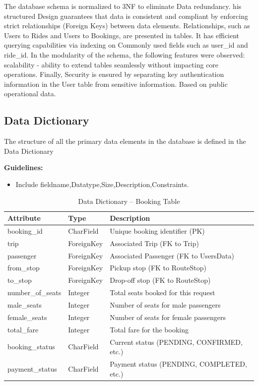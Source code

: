 The database schema is normalized to 3NF to eliminate Data redundancy. his structured
Design guarantees that data is consistent and compliant by enforcing strict relationships (Foreign Keys) between data elements.
Relationships, such as Users to Rides and Users to Bookings, are presented in tables. It has efficient querying capabilities via indexing on
Commonly used fields such as user_id and ride_id. In the modularity of the schema, the following features were observed:
scalability - ability to extend tables seamlessly without impacting core operations. Finally,
Security is ensured by separating key authentication information in the User table from sensitive information.
Based on public operational data.

\subsection{Data Dictionary}

The structure of all the primary data elements in the database is defined in the Data Dictionary

\textbf{Guidelines:}
\begin{itemize}
    \item Include fieldname,Datatype,Size,Description,Constraints.
\end{itemize}

\begin{table}[H]
\centering
\caption{Data Dictionary – Booking Table}
\renewcommand{\arraystretch}{1.5}
\begin{tabular}{|p{3cm}|p{3cm}|p{7cm}|}
\hline
\textbf{Attribute} & \textbf{Type} & \textbf{Description} \\
\hline
booking\_id & CharField & Unique booking identifier (PK) \\
\hline
trip & ForeignKey & Associated Trip (FK to Trip) \\
\hline
passenger & ForeignKey & Associated Passenger (FK to UsersData) \\
\hline
from\_stop & ForeignKey & Pickup stop (FK to RouteStop) \\
\hline
to\_stop & ForeignKey & Drop-off stop (FK to RouteStop) \\
\hline
number\_of\_seats & Integer & Total seats booked for this request \\
\hline
male\_seats & Integer & Number of seats for male passengers \\
\hline
female\_seats & Integer & Number of seats for female passengers \\
\hline
total\_fare & Integer & Total fare for the booking \\
\hline
booking\_status & CharField & Current status (PENDING, CONFIRMED, etc.) \\
\hline
payment\_status & CharField & Payment status (PENDING, COMPLETED, etc.) \\
\hline
\end{tabular}
\end{table}

